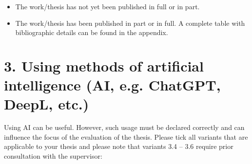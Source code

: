 \begin{itemize}
    \item[\checkboxUnchecked] The work/thesis has not yet been published in full or in part.
    \item[\checkboxUnchecked] The work/thesis has been published in part or in full. A complete table with bibliographic details can be found in the appendix.
\end{itemize}

\section*{3. Using methods of artificial intelligence (AI, e.g. ChatGPT, DeepL, etc.)}

Using AI can be useful. However, such usage must be declared correctly and can influence the focus of the evaluation of the thesis. Please tick all variants that are applicable to your thesis and please note that variants 3.4 – 3.6 require prior consultation with the supervisor:

